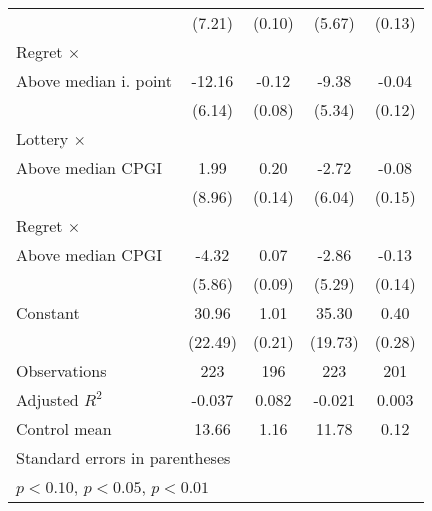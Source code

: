 \begin{table}[htbp]
\begin{tabular}{l*{4}{c}}
                &   (7.21)         &   (0.10)         &   (5.67)         &   (0.13)         \\
\addlinespace
Regret $\times$ \\ Above median i. point&   -12.16\sym{**} &    -0.12         &    -9.38\sym{*}  &    -0.04         \\
                &   (6.14)         &   (0.08)         &   (5.34)         &   (0.12)         \\
\addlinespace
Lottery $\times$ \\ Above median CPGI&     1.99         &     0.20         &    -2.72         &    -0.08         \\
                &   (8.96)         &   (0.14)         &   (6.04)         &   (0.15)         \\
\addlinespace
Regret $\times$ \\ Above median CPGI&    -4.32         &     0.07         &    -2.86         &    -0.13         \\
                &   (5.86)         &   (0.09)         &   (5.29)         &   (0.14)         \\
\addlinespace
Constant        &    30.96         &     1.01\sym{***}&    35.30\sym{*}  &     0.40         \\
                &  (22.49)         &   (0.21)         &  (19.73)         &   (0.28)         \\
\midrule
Observations    &      223         &      196         &      223         &      201         \\
Adjusted \(R^{2}\)&   -0.037         &    0.082         &   -0.021         &    0.003         \\
Control mean    &    13.66         &     1.16         &    11.78         &     0.12         \\
\bottomrule
\multicolumn{5}{l}{\footnotesize Standard errors in parentheses}\\
\multicolumn{5}{l}{\footnotesize \sym{*} \(p<0.10\), \sym{**} \(p<0.05\), \sym{***} \(p<0.01\)}\\
\end{tabular}
\end{table}

